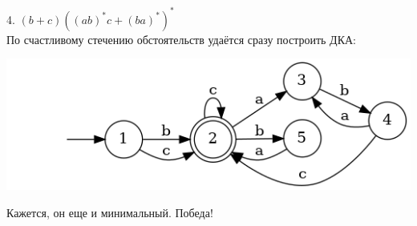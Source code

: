\documentclass{article}
\begin{document}
    4. $(b+c)((ab)^*c+(ba)^*)^*$\\
    По счастливому стечению обстоятельств удаётся сразу построить ДКА:
    \begin{center}
        \includegraphics[width=1\textwidth]{pic3_4_1.dot}\\
    \end{center}
    Кажется, он еще и минимальный. Победа!
    
\end{document}
